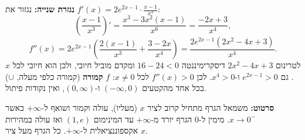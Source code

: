 \begin{solution}
\textbf{נגזרת שנייה:} נגזור את $f'(x)=2e^{2x-1}\cdot\frac{x-1}{x^3}$:
\[ \left(\frac{x-1}{x^3}\right)' = \frac{x^3-3x^2(x-1)}{x^6} = \frac{-2x+3}{x^4}, \]
\[ f''(x) = 2e^{2x-1}\left(\frac{2(x-1)}{x^3}+\frac{3-2x}{x^4}\right) = \frac{2e^{2x-1}\left(2x^2-4x+3\right)}{x^4}. \]
לטרינום $2x^2-4x+3$ דיסקרימיננטה $16-24<0$ ומקדם מוביל חיובי, ולכן הוא חיובי לכל $x$. גם $e^{2x-1}>0$ ו-$x^4>0$. לכן $f''(x)>0$ לכל $x\ne0$:
$f$ \textbf{קמורה} (קמורה כלפי מעלה, $\cup$) בכל אחד מהקטעים $(-\infty,0)$ ו-$(0,\infty)$, ואין נקודות פיתול.

\textbf{סרטוט:} משמאל הגרף מתחיל קרוב לציר $x$ (מעליו), עולה וקמור ושואף ל-$+\infty$ כאשר $x\to0^-$. מימין ל-$0$ הגרף יורד מ-$+\infty$ עד המינימום $(1,e)$ ואז עולה במהירות אקספוננציאלית ל-$+\infty$. כל הגרף מעל ציר $x$.
\end{solution}
